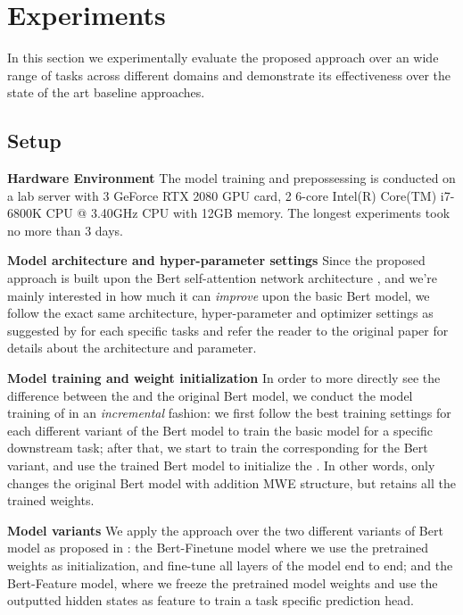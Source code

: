 \section{Experiments}\label{sec:bert_mwe_experiments}

In this section we experimentally evaluate the proposed approach over an wide range of tasks across different domains and demonstrate its effectiveness over the state of the art baseline approaches.




\subsection{Setup}

\noindent \textbf{Hardware Environment}
The model training and prepossessing is conducted on a lab server with 3 
GeForce RTX 2080 GPU card, 2 6-core Intel(R) Core(TM) i7-6800K CPU @ 3.40GHz CPU with 12GB memory. The longest experiments took no more than 3 days.


\noindent \textbf{Model architecture and hyper-parameter settings}
Since the proposed \BertMWE approach is built upon the Bert self-attention network architecture \cite{devlin2018bert},
and 
we're mainly interested in how much it can \textit{improve} upon the basic Bert model, 
we follow the exact same architecture, hyper-parameter and optimizer settings as suggested by 
\cite{devlin2018bert} for each specific tasks 
and refer the reader to the original paper for details about the architecture and parameter.

\noindent \textbf{Model training and weight initialization}
In order to more directly see the difference between the \BertMWE and the original Bert model, we conduct the model training of \BertMWE in an \textit{incremental} fashion:
we first follow the best training settings for each different variant of the Bert model  to train the basic model for a specific downstream task; after that, we start to train the corresponding \BertMWE 
for the Bert variant, and use the trained Bert model to initialize the \BertMWE. In other words, \BertMWE only changes the original Bert model with addition MWE structure, but retains all the trained weights.

\noindent \textbf{Model variants}
We apply the \BertMWE approach over the two different variants of Bert model as proposed in \cite{devlin2018bert}: the Bert-Finetune model where we use the pretrained weights as initialization, and fine-tune all layers of the model end to end; and the Bert-Feature model, where we freeze the pretrained  model weights and use the outputted hidden states as feature to train a task specific prediction head. 

